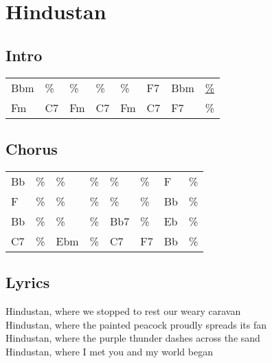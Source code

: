 \section{Hindustan}


\subsection*{Intro}


\begin{tabular}{l l l l l l l l}
Bbm & \% & \% & \% & \% & F7 & Bbm & \underline{\%} \\ 
Fm & C7 & Fm & C7 & Fm & C7 & F7 & \% \\ 
\end{tabular}


\subsection*{Chorus}


\begin{tabular}{l l l l l l l l}
Bb & \% & \% & \% & \% & \% & F & \% \\ 
F & \% & \% & \% & \% & \% & Bb & \% \\ 
Bb & \% & \% & \% & Bb7 & \% & Eb & \% \\ 
C7 & \% & Ebm & \% & C7 & F7 & Bb & \% \\ 
\end{tabular}


\subsection*{Lyrics}


Hindustan, where we stopped to rest our weary caravan \\ 
Hindustan, where the painted peacock proudly spreads its fan \\ 
Hindustan, where the purple thunder dashes across the sand \\ 
Hindustan, where I met you and my world began \\ 


